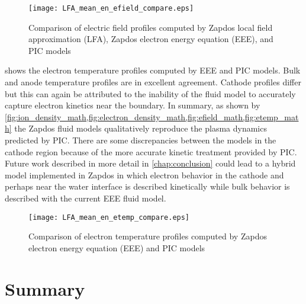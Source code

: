 \begin{figure}[htbp]
  \centering
  \texttt{[image: LFA\_mean\_en\_efield\_compare.eps]}
  \caption{Comparison of electric field profiles computed by Zapdos local field approximation (LFA), Zapdos electron energy equation (EEE), and PIC models}
  \label{fig:efield_math}
\end{figure}

 shows the electron temperature profiles computed by EEE and PIC models. Bulk and anode temperature profiles are in excellent agreement. Cathode profiles differ but this can again be attributed to the inability of the fluid model to accurately capture electron kinetics near the boundary. In summary, as shown by \cref{fig:ion_density_math,fig:electron_density_math,fig:efield_math,fig:etemp_math} the Zapdos fluid models qualitatively reproduce the plasma dynamics predicted by PIC. There are some discrepancies between the models in the cathode region because of the more accurate kinetic treatment provided by PIC. Future work described in more detail in \cref{chap:conclusion} could lead to a hybrid model implemented in Zapdos in which electron behavior in the cathode and perhaps near the water interface is described kinetically while bulk behavior is described with the current EEE fluid model.

\begin{figure}[htbp]
  \centering
  \texttt{[image: LFA\_mean\_en\_etemp\_compare.eps]}
  \caption{Comparison of electron temperature profiles computed by Zapdos electron energy equation (EEE) and PIC models}
  \label{fig:etemp_math}
\end{figure}

\section{Summary}

